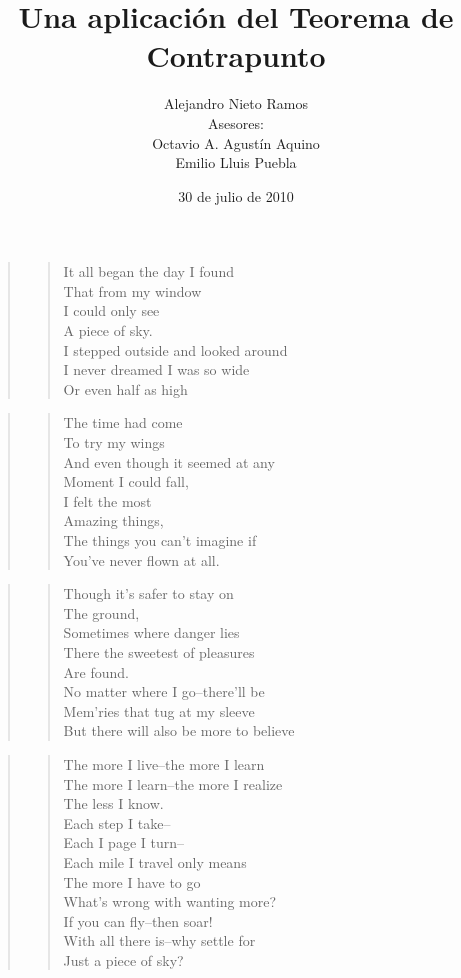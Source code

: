 \documentclass[letterpaper,12pt]{book}
\author{Alejandro Nieto Ramos\\Asesores:\\Octavio A. Agustín Aquino\\Emilio Lluis Puebla}
\title{Una aplicación del Teorema de Contrapunto}
\date{30 de julio de 2010}
\theoremstyle{definition} \newtheorem{Def}{Definición}[chapter]
\theoremstyle{definition} \newtheorem{Teo}{Teorema}[chapter]
\theoremstyle{definition} \newtheorem{Pro}{Proposición}[chapter]
\theoremstyle{definition} \newtheorem{Lema}{Lema}[chapter]
\begin{document}
\maketitle

\frontmatter
\begin{quote}
\begin{verse}
It all began the day I found\\
That from my window\\
I could only see\\
A piece of sky.\\
I stepped outside and looked around\\
I never dreamed I was so wide\\
Or even half as high\\
\end{verse}
\end{quote}
\begin{quote}
\begin{verse}
The time had come\\
To try my wings\\
And even though it seemed at any\\
Moment I could fall,\\
I felt the most\\
Amazing things,\\
The things you can't imagine if\\
You've never flown at all.\\
\end{verse}
\end{quote}
\begin{quote}
\begin{verse}
Though it's safer to stay on\\ 
The ground,\\
Sometimes where danger lies\\
There the sweetest of pleasures\\
Are found.\\
No matter where I go--there'll be\\
Mem'ries that tug at my sleeve\\
But there will also be more to believe\\
\end{verse}
\end{quote}
\begin{quote}
\begin{verse}
The more I live--the more I learn\\
The more I learn--the more I realize\\
The less I know.\\
Each step I take--\\
Each I page I turn--\\
Each mile I travel only means\\
The more I have to go\\
What's wrong with wanting more?\\
If you can fly--then soar!\\
With all there is--why settle for\\
Just a piece of sky?\\
\end{verse}
\end{quote}
\end{document}
